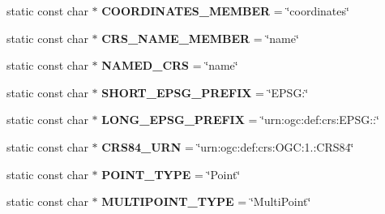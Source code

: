 \begin{DoxyCompactItemize}
\item 
\mbox{\label{classItem__func__geomfromgeojson_a6165edd1ca21b134355d25478d11f61f}} 
static const char $\ast$ {\bfseries C\+O\+O\+R\+D\+I\+N\+A\+T\+E\+S\+\_\+\+M\+E\+M\+B\+ER} = \char`\"{}coordinates\char`\"{}
\item 
\mbox{\label{classItem__func__geomfromgeojson_a1ee83150621b280b5a044cea6267588d}} 
static const char $\ast$ {\bfseries C\+R\+S\+\_\+\+N\+A\+M\+E\+\_\+\+M\+E\+M\+B\+ER} = \char`\"{}name\char`\"{}
\item 
\mbox{\label{classItem__func__geomfromgeojson_ada3c791a2d67068eb6f3c0b5c4827736}} 
static const char $\ast$ {\bfseries N\+A\+M\+E\+D\+\_\+\+C\+RS} = \char`\"{}name\char`\"{}
\item 
\mbox{\label{classItem__func__geomfromgeojson_a1a3c5783354292dd7e60ab44346fa626}} 
static const char $\ast$ {\bfseries S\+H\+O\+R\+T\+\_\+\+E\+P\+S\+G\+\_\+\+P\+R\+E\+F\+IX} = \char`\"{}E\+P\+S\+G\+:\char`\"{}
\item 
\mbox{\label{classItem__func__geomfromgeojson_a60e01de71d4903354d7979d60c2386a2}} 
static const char $\ast$ {\bfseries L\+O\+N\+G\+\_\+\+E\+P\+S\+G\+\_\+\+P\+R\+E\+F\+IX} = \char`\"{}urn\+:ogc\+:def\+:crs\+:\+E\+P\+S\+G\+::\char`\"{}
\item 
\mbox{\label{classItem__func__geomfromgeojson_a99591722985bd092592dec35cc1d6770}} 
static const char $\ast$ {\bfseries C\+R\+S84\+\_\+\+U\+RN} = \char`\"{}urn\+:ogc\+:def\+:crs\+:\+O\+G\+C\+:1.\+:\+C\+R\+S84\char`\"{}
\item 
\mbox{\label{classItem__func__geomfromgeojson_ac4c9df81f92a789e28b4dfb51d0d5e85}} 
static const char $\ast$ {\bfseries P\+O\+I\+N\+T\+\_\+\+T\+Y\+PE} = \char`\"{}Point\char`\"{}
\item 
\mbox{\label{classItem__func__geomfromgeojson_ab7dce176302566373725e74b562fad3c}} 
static const char $\ast$ {\bfseries M\+U\+L\+T\+I\+P\+O\+I\+N\+T\+\_\+\+T\+Y\+PE} = \char`\"{}Multi\+Point\char`\"{}

\end{DoxyCompactItemize}
